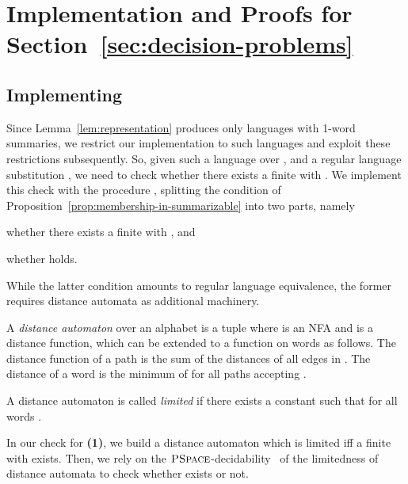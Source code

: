 \documentclass[envcountsame]{llncs}
\newcommand{\PSPACE}{\complexityclass{PSpace}}
\newcommand{\complexityclass}[1]{\ensuremath{\textsc{#1}}\xspace}
\begin{document}
%
 \section{Implementation and Proofs for Section~\ref{sec:decision-problems}}
\label{sec:decision-problems-detail}


\subsection{Implementing }
\label{sec:impl-prop}
Since Lemma~\ref{lem:representation} produces only languages
 with 1-word summaries,
we restrict our implementation to such languages and exploit these
restrictions subsequently.
So, given such a language  over , and a regular language
substitution , we need to
check whether there exists a finite  with
.
We implement this check with the procedure
, splitting the condition of
Proposition~\ref{prop:membership-in-summarizable} into two parts,
namely
\begin{inparaenum}[\bfseries(1)]
\item whether there exists a finite  with
  , and
\item whether  holds.
\end{inparaenum}
While the latter condition amounts to regular language equivalence,
the former requires distance automata as additional machinery.



\begin{definition}
  \label{def:distance-automaton}
  A \emph{distance automaton} over an alphabet  is a tuple
   where  is an NFA and  is a distance function, which can be extended
  to a function on words as follows.
The distance function  of a path  is the sum of the
  distances of all edges in .
The distance  of a word  is the minimum of
   for all paths  accepting .

  A distance automaton  is called \emph{limited} if there exists
  a constant  such that  for all words .
\end{definition}

In our check for {\bfseries(1)}, we build a distance automaton which
is limited iff a finite  with  exists.
Then, we rely on the
\PSPACE-decidability~\cite{leung04:_limit_probl_distan_autom} of the
limitedness of distance automata to check whether  exists or not.
\end{document}

